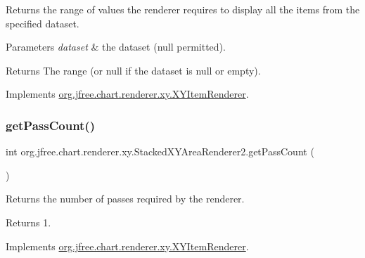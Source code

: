 Returns the range of values the renderer requires to display all the items from the specified dataset.


\begin{DoxyParams}{Parameters}
{\em dataset} & the dataset ({\ttfamily null} permitted).\\
\hline
\end{DoxyParams}
\begin{DoxyReturn}{Returns}
The range (or {\ttfamily null} if the dataset is {\ttfamily null} or empty). 
\end{DoxyReturn}


Implements \mbox{\hyperlink{interfaceorg_1_1jfree_1_1chart_1_1renderer_1_1xy_1_1_x_y_item_renderer_af9ac6f440e99c73d343de7851e89496a}{org.\+jfree.\+chart.\+renderer.\+xy.\+X\+Y\+Item\+Renderer}}.

\mbox{\label{classorg_1_1jfree_1_1chart_1_1renderer_1_1xy_1_1_stacked_x_y_area_renderer2_aef69f925cb2e64313b5ddfa58ec6e09f}} 
\subsubsection{\texorpdfstring{get\+Pass\+Count()}{getPassCount()}}
{\footnotesize\ttfamily int org.\+jfree.\+chart.\+renderer.\+xy.\+Stacked\+X\+Y\+Area\+Renderer2.\+get\+Pass\+Count (\begin{DoxyParamCaption}{ }\end{DoxyParamCaption})}

Returns the number of passes required by the renderer.

\begin{DoxyReturn}{Returns}
1. 
\end{DoxyReturn}


Implements \mbox{\hyperlink{interfaceorg_1_1jfree_1_1chart_1_1renderer_1_1xy_1_1_x_y_item_renderer_afe42489776da2a4c7e64838382bbaea1}{org.\+jfree.\+chart.\+renderer.\+xy.\+X\+Y\+Item\+Renderer}}.

\mbox{\label{classorg_1_1jfree_1_1chart_1_1renderer_1_1xy_1_1_stacked_x_y_area_renderer2_ae89c0a904ba6f253d83ee8c642f76119}} 
